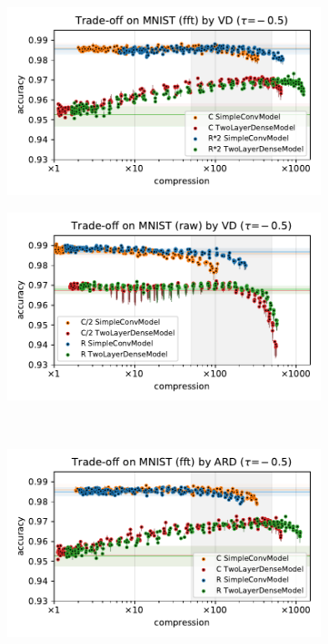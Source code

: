 \documentclass[a4paper,10pt,onecolumn]{article}
\begin{document}
\begin{figure}[b]
  \begin{subfigure}[b]{0.5\columnwidth}
    \centering
    \includegraphics[width=\columnwidth]{figure__mnist-like__trade-off/appendix__cmp__VD__mnist__fft__-0.5.pdf}
  \end{subfigure}%
  \begin{subfigure}[b]{0.5\columnwidth}
    \centering
    \includegraphics[width=\columnwidth]{figure__mnist-like__trade-off/appendix__cmp__VD__mnist__raw__-0.5.pdf}
  \end{subfigure} \\%
  \begin{subfigure}[b]{0.5\columnwidth}
    \centering
    \includegraphics[width=\columnwidth]{figure__mnist-like__trade-off/appendix__ARD__mnist__fft__-0.5.pdf}

\end{subfigure}
\end{figure}
\end{document}

